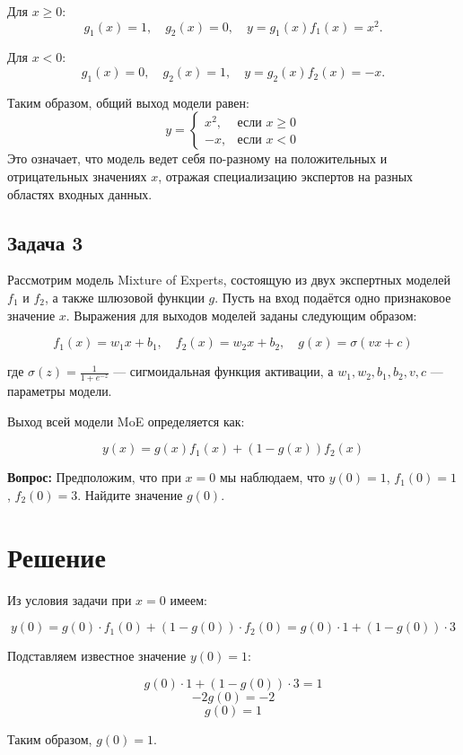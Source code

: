 \documentclass{article}
\begin{document}
Для $x \geq 0$: 
\[
g_1(x) = 1, \quad g_2(x) = 0, \quad y = g_1(x) f_1(x) = x^2.
\]

Для $x < 0$: 
\[
g_1(x) = 0, \quad g_2(x) = 1, \quad y = g_2(x) f_2(x) = -x.
\]

Таким образом, общий выход модели равен:
\[
y = 
\begin{cases} 
x^2, & \text{если } x \geq 0 \\ 
-x, & \text{если } x < 0 
\end{cases}
\]
Это означает, что модель ведет себя по-разному на положительных и отрицательных значениях $x$, отражая специализацию экспертов на разных областях входных данных.


\subsection*{Задача 3}
Рассмотрим модель Mixture of Experts, состоящую из двух экспертных моделей $f_1$ и $f_2$, а также шлюзовой функции $g$. Пусть на вход подаётся одно признаковое значение $x$. Выражения для выходов моделей заданы следующим образом:

$$
f_1(x) = w_1 x + b_1, \quad f_2(x) = w_2 x + b_2, \quad g(x) = \sigma(v x + c)
$$

где $\sigma(z) = \frac{1}{1 + e^{-z}}$ — сигмоидальная функция активации, а $w_1, w_2, b_1, b_2, v, c$ — параметры модели.

Выход всей модели MoE определяется как:

$$
y(x) = g(x) f_1(x) + (1 - g(x)) f_2(x)
$$

\textbf{Вопрос:} Предположим, что при $x = 0$ мы наблюдаем, что $y(0) = 1$, $f_1(0) = 1$, $f_2(0) = 3$. Найдите значение $g(0)$.

\section*{Решение}

Из условия задачи при $x = 0$ имеем:

$$
y(0) = g(0) \cdot f_1(0) + (1 - g(0)) \cdot f_2(0) = g(0) \cdot 1 + (1 - g(0)) \cdot 3
$$

Подставляем известное значение $y(0) = 1$:

$$
g(0) \cdot 1 + (1 - g(0)) \cdot 3 = 1
$$
$$
-2 g(0) = -2
$$
$$
g(0) = 1
$$

Таким образом, $g(0) = 1$.
\end{document}
